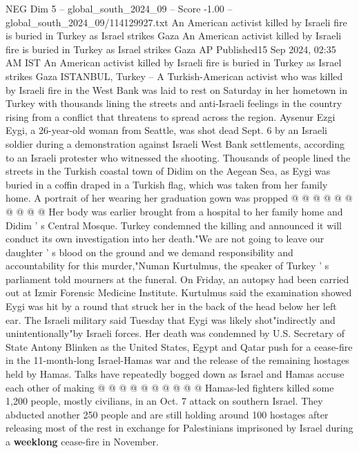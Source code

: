 \begin{textsample}{NEG Dim 5 – global\_south\_2024\_09 – Score -1.00 – global\_south\_2024\_09/114129927.txt}  \label{ex:f5_neg_193}
An American activist killed by Israeli fire is buried in Turkey as Israel strikes Gaza An American activist killed by Israeli fire is buried in Turkey as Israel strikes Gaza AP Published15 Sep 2024, 02:35 AM IST An American activist killed by Israeli fire is buried in Turkey as Israel strikes Gaza ISTANBUL, Turkey -- A Turkish-American activist who was killed by Israeli fire in the West Bank was laid to rest on Saturday in her hometown in Turkey with thousands lining the streets and anti-Israeli feelings in the country rising from a conflict that threatens to spread across the region.
Aysenur Ezgi Eygi, a 26-year-old woman from Seattle, was shot dead Sept. 6 by an Israeli soldier during a demonstration against Israeli West Bank settlements, according to an Israeli protester who witnessed the shooting.
Thousands of people lined the streets in the Turkish coastal town of Didim on the Aegean Sea, as Eygi was buried in a coffin draped in a Turkish flag, which was taken from her family home.
A portrait of her wearing her graduation gown was propped @ @ @ @ @ @ @ @ @ @ Her body was earlier brought from a hospital to her family home and Didim ' s Central Mosque.
Turkey condemned the killing and announced it will conduct its own investigation into her death."We are not going to leave our daughter ' s blood on the ground and we demand responsibility and accountability for this murder,"Numan Kurtulmus, the speaker of Turkey ' s parliament told mourners at the funeral.
On Friday, an autopsy had been carried out at Izmir Forensic Medicine Institute.
Kurtulmus said the examination showed Eygi was hit by a round that struck her in the back of the head below her left ear.
The Israeli military said Tuesday that Eygi was likely shot"indirectly and unintentionally"by Israeli forces.
Her death was condemned by U.S.
Secretary of State Antony Blinken as the United States, Egypt and Qatar push for a cease-fire in the 11-month-long Israel-Hamas war and the release of the remaining hostages held by Hamas.
Talks have repeatedly bogged down as Israel and Hamas accuse each other of making @ @ @ @ @ @ @ @ @ @ Hamas-led fighters killed some 1,200 people, mostly civilians, in an Oct. 7 attack on southern Israel.
They abducted another 250 people and are still holding around 100 hostages after releasing most of the rest in exchange for Palestinians imprisoned by Israel during a \textbf{weeklong} cease-fire in November.

\end{textsample}
